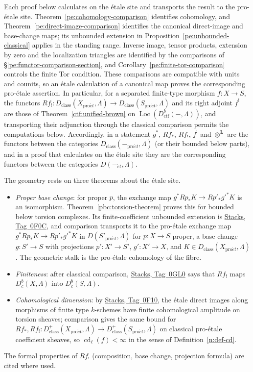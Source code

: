 \documentclass[11pt,a4paper]{article}
\numberwithin{equation}{section}
\theoremstyle{definition}
\theoremstyle{remark}
\newcommand{\Dbc}{D^b_c}
\newcommand{\Loc}{\operatorname{Loc}}
\newcommand{\et}{\acute{e}t}
\newcommand{\proet}{\mathrm{pro}\acute{e}t}
\newcommand{\stacks}[1]{\href{https://stacks.math.columbia.edu/tag/#1}{\textnormal{Stacks, Tag~#1}}}
\newcommand{\Dctf}{D^b_{\mathrm{ctf}}}
\begin{document}
Each proof below calculates on the \'etale site and transports the
result to the pro-\'etale site. Theorem~\ref{pe:cohomology-comparison} identifies cohomology,
and Theorem~\ref{pe:direct-image-comparison} identifies the canonical
direct-image and base-change maps; its unbounded extension in
Proposition~\ref{pe:unbounded-classical} applies in the standing range.
Inverse image, tensor products, extension by zero and the localization
triangles are identified by the comparisons of
\S\ref{pe:functor-comparison-section}, and
Corollary~\ref{pe:finite-tor-comparison} controls the finite Tor
condition. These comparisons are compatible with units and counits, so an
\'etale calculation of a canonical map proves the corresponding
pro-\'etale assertion. In particular, for a separated finite-type morphism $f:X\to S$,
the functors $Rf_!\colon D_{\mathrm{class}}(X_{\proet},\Lambda)\to
D_{\mathrm{class}}(S_{\proet},\Lambda)$ and its right adjoint $f^!$
are those of Theorem~\ref{ctf:unified-brown} on
$\Loc(\Dctf(-,\Lambda))$, and transporting their adjunction through the
classical comparison permits the computations below. Accordingly, in a
statement $g^*$, $Rf_*$, $Rf_!$, $f^!$ and $\otimes^{\mathbf L}$ are the
functors between the categories $D_{\mathrm{class}}(-_{\proet},\Lambda)$
(or their bounded below parts), and in a proof that calculates on the
\'etale site they are the corresponding functors between the categories
$D(-_{\et},\Lambda)$.

The geometry rests on three theorems about the \'etale site.
\begin{itemize}
\item \emph{Proper base change}: for proper $p$, the exchange map
  $g^*Rp_*K\to Rp'_*g'^*K$ is an isomorphism.
  Theorem~\ref{pbc:torsion-theorem} proves this for bounded below
  torsion complexes. Its finite-coefficient
  unbounded extension is \stacks{0F0C}, and comparison transports it to
  the pro-\'etale exchange map
  $g^*Rp_*K\to Rp'_*g'^*K$ in $D(S'_{\proet},\Lambda)$ for
  $p:X\to S$ proper, a base change $g:S'\to S$ with projections
  $p':X'\to S'$, $g':X'\to X$, and
  $K\in D_{\mathrm{class}}(X_{\proet},\Lambda)$.
  The geometric stalk is the pro-\'etale cohomology of the fibre.
\item \emph{Finiteness}: after classical comparison, \stacks{0GL0}
  says that $Rf_!$ maps $\Dbc(X,\Lambda)$ into $\Dbc(S,\Lambda)$.
\item \emph{Cohomological dimension}: by \stacks{0F10}, the \'etale
  direct images along morphisms of finite type $k$-schemes have finite
  cohomological amplitude on torsion sheaves; comparison gives the same
  bound for
  $Rf_*,Rf_!\colon D^+_{\mathrm{class}}(X_{\proet},\Lambda)\to
  D^+_{\mathrm{class}}(S_{\proet},\Lambda)$ on classical pro-\'etale
  coefficient sheaves, so $\operatorname{cd}_\ell(f)<\infty$ in the
  sense of Definition~\ref{n:def-cd}.
\end{itemize}
The formal properties of $Rf_!$ (composition, base change, projection
formula) are cited where used.
\end{document}
